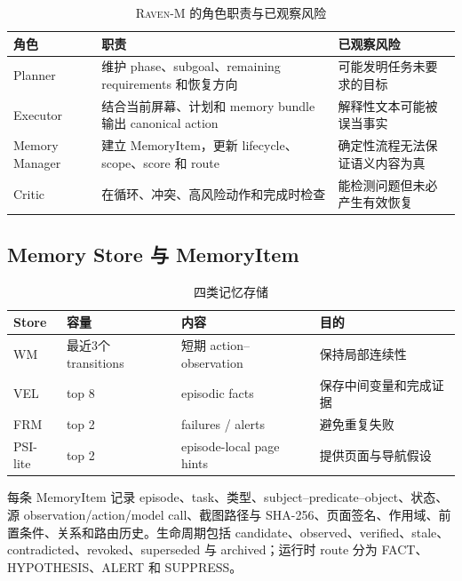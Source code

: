 \documentclass[12pt,a4paper]{ctexart}
\newcommand{\ravenm}{\textsc{Raven-M}}
\begin{document}
\begin{table}[H]
    \centering
    \caption{\ravenm{} 的角色职责与已观察风险}
    \label{tab:roles}
    \small
    \begin{tabularx}{\textwidth}{p{3.0cm}p{5.0cm}Y}
        \toprule
        角色 & 职责 & 已观察风险 \\
        \midrule
        Planner & 维护 phase、subgoal、remaining requirements 和恢复方向 & 可能发明任务未要求的目标 \\
        Executor & 结合当前屏幕、计划和 memory bundle 输出 canonical action & 解释性文本可能被误当事实 \\
        Memory Manager & 建立 MemoryItem，更新 lifecycle、scope、score 和 route & 确定性流程无法保证语义内容为真 \\
        Critic & 在循环、冲突、高风险动作和完成时检查 & 能检测问题但未必产生有效恢复 \\
        \bottomrule
    \end{tabularx}
\end{table}

\subsection{Memory Store 与 MemoryItem}

\begin{table}[H]
    \centering
    \caption{四类记忆存储}
    \label{tab:stores}
    \small
    \begin{tabularx}{\textwidth}{p{2.3cm}p{2.2cm}p{4.3cm}Y}
        \toprule
        Store & 容量 & 内容 & 目的 \\
        \midrule
        WM & 最近3个 transitions & 短期 action--observation & 保持局部连续性 \\
        VEL & top 8 & episodic facts & 保存中间变量和完成证据 \\
        FRM & top 2 & failures / alerts & 避免重复失败 \\
        PSI-lite & top 2 & episode-local page hints & 提供页面与导航假设 \\
        \bottomrule
    \end{tabularx}
\end{table}

每条 MemoryItem 记录 episode、task、类型、subject--predicate--object、状态、源 observation/action/model call、截图路径与 SHA-256、页面签名、作用域、前置条件、关系和路由历史。生命周期包括 candidate、observed、verified、stale、contradicted、revoked、superseded 与 archived；运行时 route 分为 FACT、HYPOTHESIS、ALERT 和 SUPPRESS。
\end{document}
